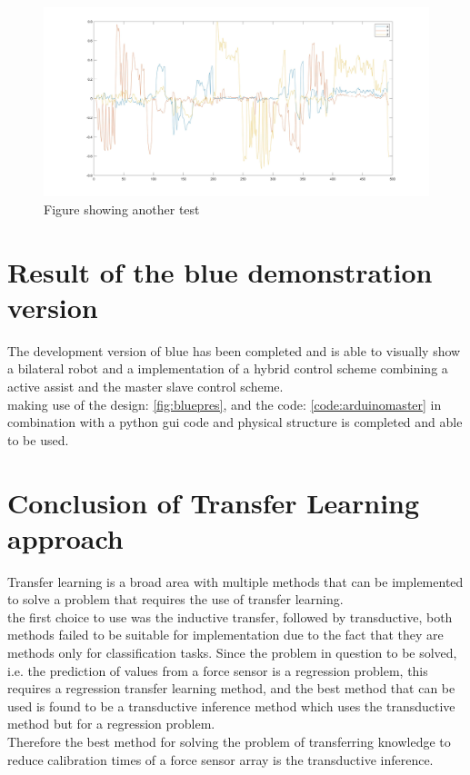 \begin{figure}[p]%
	\centering
	\includegraphics[width=1.2\linewidth]{figures/ch4/matlabresult2}
	\caption{Figure showing another test}
	\label{fig:matlab2}
\end{figure}

\section{Result of the \ac{blue} demonstration version}
The development version of \ac{blue} has been completed and is able to visually show a bilateral robot and a implementation of a hybrid control scheme combining a active assist and the master slave control scheme.\\
making use of the design: \ref{fig:bluepres}, and the code: \ref{code:arduinomaster} in combination with a python gui code and physical structure is completed and able to be used.

\section{Conclusion of Transfer Learning approach}
Transfer learning is a broad area with multiple methods that can be implemented to solve a problem that requires the use of transfer learning.\\
the first choice to use was the inductive transfer, followed by transductive, both methods failed to be suitable for implementation due to the fact that they are methods only for classification tasks. Since the problem in question to be solved, i.e. the prediction of values from a force sensor is a regression problem, this requires a regression transfer learning method, and the best method that can be used is found to be a transductive inference method which uses the transductive method but for a regression problem.\\
Therefore the best method for solving the problem of transferring knowledge to reduce calibration times of a force sensor array is the transductive inference.
